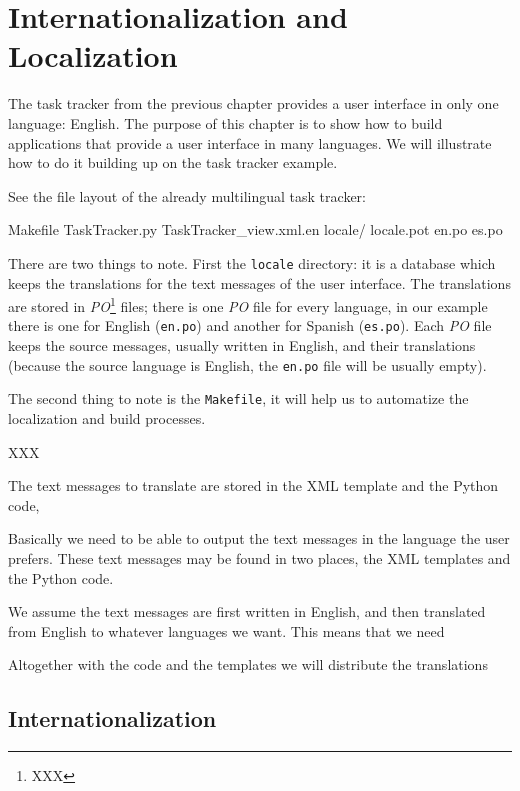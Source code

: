 \chapter{Internationalization and Localization}
\label{Chapter: i18n}

The task tracker from the previous chapter provides a user interface in
only one language: English. The purpose of this chapter is to show how
to build applications that provide a user interface in many languages.
We will illustrate how to do it building up on the task tracker example.

See the file layout of the already multilingual task tracker:

\begin{code}
    Makefile
    TaskTracker.py
    TaskTracker_view.xml.en
    locale/
      locale.pot
      en.po
      es.po
\end{code}

There are two things to note. First the {\tt locale} directory: it is
a database which keeps the translations for the text messages of the user
interface. The translations are stored in {\em PO}\footnote{XXX} files;
there is one {\em PO} file for every language, in our example there is
one for English ({\tt en.po}) and another for Spanish ({\tt es.po}). Each
{\em PO} file keeps the source messages, usually written in English, and
their translations (because the source language is English, the {\tt en.po}
file will be usually empty).

The second thing to note is the {\tt Makefile}, it will help us to automatize
the localization and build processes.

XXX


The text messages to translate are stored in the XML template and the Python
code, 



Basically we need to be able to output the text messages in the language
the user prefers. These text messages may be found in two places, the
XML templates and the Python code.

We assume the text messages are first written in English, and then translated
from English to whatever languages we want. This means that we need 



Altogether with the code and the templates we will distribute the translations



\section{Internationalization}

